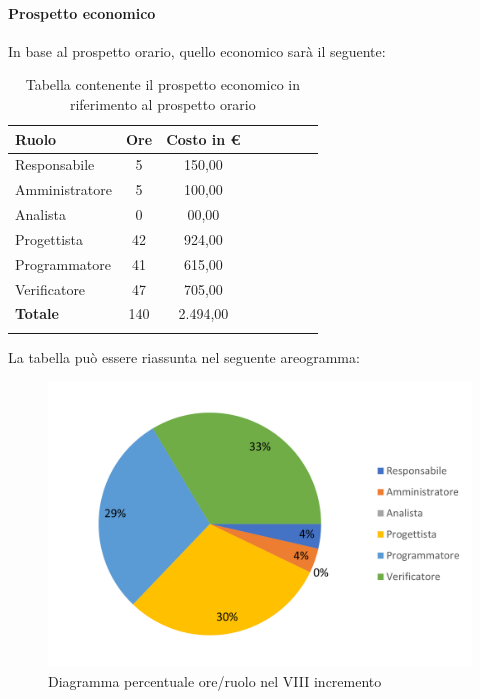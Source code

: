 \paragraph{Prospetto economico}
In base al prospetto orario, quello economico sarà il seguente:

\begin{longtable}{|l|c|c|c|c|c|c|c|}
	\hline
	\rowcolor{lighter-grayer}
	\textbf{Ruolo}  & \textbf{Ore} & \textbf{Costo in €} \\
	\hline
	\endfirsthead

	\hline
	Responsabile    & 5            & 150,00              \\
	\hline
	\hline
	Amministratore  & 5           & 100,00              \\
	\hline
	\hline
	Analista        & 0           & 00,00              \\
	\hline
	\hline
	Progettista     & 42            & 924,00                   \\
	\hline
	\hline
	Programmatore   & 41            & 615,00                   \\
	\hline
	\hline
	Verificatore    & 47            & 705,00                   \\
	\hline
	\textbf{Totale} & 140           & 2.494,00            \\
	\hline
	\rowcolor{white}
	\caption{Tabella contenente il prospetto economico in riferimento al prospetto orario}
\end{longtable}
\pagebreak

La tabella può essere riassunta nel seguente areogramma:
\begin{figure}[H]
	\centering
	\includegraphics[width=0.8\linewidth]{res/images/preventivo/dettaglio_termineimp/1-2.png}
	\caption{Diagramma percentuale ore/ruolo nel VIII incremento}
	\label{fig:diagramma costi ruolo  VIII incremento}
\end{figure}

